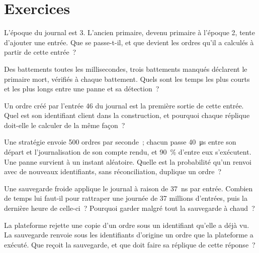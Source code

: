 \section{Exercices}

\begin{exercise}[$\star$]\label{exo:ll:resilience:1}
L'époque du journal est 3. L'ancien primaire, devenu primaire à l'époque 2, tente d'ajouter une entrée. Que se passe-t-il, et que devient
les ordres qu'il a calculés à partir de cette entrée~?
\end{exercise}

\begin{exercise}[$\star$]\label{exo:ll:resilience:2}
Des battements toutes les millisecondes, trois battements manqués déclarent le primaire mort, vérifiés à chaque battement. Quels sont les temps
les plus courts et les plus longs entre une panne et sa détection~?
\end{exercise}

\begin{exercise}[$\star$]\label{exo:ll:resilience:3}
Un ordre créé par l'entrée 46 du journal est la première sortie de cette entrée. Quel est son identifiant client dans la construction, et
pourquoi chaque réplique doit-elle le calculer de la même façon~?
\end{exercise}

\begin{exercise}[$\star\star$]\label{exo:ll:resilience:4}
Une stratégie envoie 500 ordres par seconde~; chacun passe \qty{40}{\micro\second} entre son départ et l'journalisation de son compte rendu,
et 90~\% d'entre eux s'exécutent. Une panne survient à un instant aléatoire. Quelle est la probabilité qu'un renvoi avec de nouveaux identifiants,
sans réconciliation, duplique un ordre~?
\end{exercise}

\begin{exercise}[$\star\star$]\label{exo:ll:resilience:5}
Une sauvegarde froide applique le journal à raison de \qty{37}{\nano\second} par entrée. Combien de temps lui faut-il pour rattraper une journée de
37 millions d'entrées, puis la dernière heure de celle-ci~? Pourquoi garder malgré tout la sauvegarde à chaud~?
\end{exercise}

\begin{exercise}[$\star\star$]\label{exo:ll:resilience:6}
La plateforme rejette une copie d'un ordre sous un identifiant qu'elle a déjà vu. La sauvegarde renvoie sous les identifiants d'origine un ordre
que la plateforme a exécuté. Que reçoit la sauvegarde, et que doit faire sa réplique de cette réponse~?
\end{exercise}

